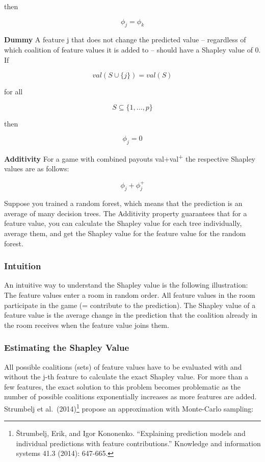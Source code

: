 \documentclass[
  10pt,
]{scrbook}
\begin{document}
then

\[\phi_j=\phi_{k}\]

\textbf{Dummy}
A feature j that does not change the predicted value -- regardless of which coalition of feature values it is added to -- should have a Shapley value of 0.
If

\[val(S\cup\{j\})=val(S)\]

for all

\[S\subseteq\{1,\ldots,p\}\]

then

\[\phi_j=0\]

\textbf{Additivity}
For a game with combined payouts val+val\textsuperscript{+} the respective Shapley values are as follows:

\[\phi_j+\phi_j^{+}\]

Suppose you trained a random forest, which means that the prediction is an average of many decision trees.
The Additivity property guarantees that for a feature value, you can calculate the Shapley value for each tree individually, average them, and get the Shapley value for the feature value for the random forest.

\hypertarget{intuition}{%
\subsubsection{Intuition}\label{intuition}}

An intuitive way to understand the Shapley value is the following illustration:
The feature values enter a room in random order.
All feature values in the room participate in the game (= contribute to the prediction).
The Shapley value of a feature value is the average change in the prediction that the coalition already in the room receives when the feature value joins them.

\hypertarget{estimating-the-shapley-value}{%
\subsubsection{Estimating the Shapley Value}\label{estimating-the-shapley-value}}

All possible coalitions (sets) of feature values have to be evaluated with and without the j-th feature to calculate the exact Shapley value.
For more than a few features, the exact solution to this problem becomes problematic as the number of possible coalitions exponentially increases as more features are added.
Strumbelj et al.~(2014)\footnote{Štrumbelj, Erik, and Igor Kononenko. ``Explaining prediction models and individual predictions with feature contributions.'' Knowledge and information systems 41.3 (2014): 647-665.} propose an approximation with Monte-Carlo sampling:
\end{document}
